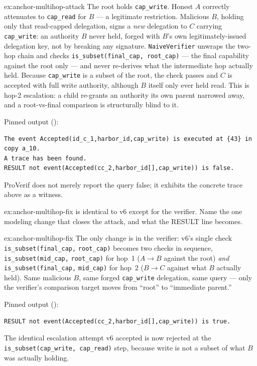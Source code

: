 \documentclass[11pt,a4paper]{article}
\theoremstyle{definition}
\begin{document}
\begin{pdsolution}{ex:anchor-multihop-attack}
The root holds \texttt{cap\_write}. Honest $A$ correctly attenuates to \texttt{cap\_read} for $B$ --- a legitimate restriction. Malicious $B$, holding only that read-capped delegation, signs a \emph{new} delegation to $C$ carrying \texttt{cap\_write}: an authority $B$ never held, forged with $B$'s own legitimately-issued delegation key, not by breaking any signature. \texttt{NaiveVerifier} unwraps the two-hop chain and checks \texttt{is\_subset(final\_cap, root\_cap)} --- the final capability against the root only --- and never re-derives what the intermediate hop actually held. Because \texttt{cap\_write} is a subset of the root, the check passes and $C$ is accepted with full write authority, although $B$ itself only ever held read. This is hop-2 escalation: a child re-grants an authority its own parent narrowed away, and a root-vs-final comparison is structurally blind to it.

Pinned output ():
\begin{lstlisting}
The event Accepted(id_c_1,harbor_id,cap_write) is executed at {43} in copy a_10.
A trace has been found.
RESULT not event(Accepted(cc_2,harbor_id[],cap_write)) is false.
\end{lstlisting}
ProVerif does not merely report the query false; it exhibits the concrete trace above as a witness.
\end{pdsolution}
\begin{pdexercise}[kind=Check,rating=1]{ex:anchor-multihop-fix}
 is identical to v6 except for the verifier. Name the one modeling change that closes the attack, and what the RESULT line becomes.
\end{pdexercise}
\begin{pdsolution}{ex:anchor-multihop-fix}
The only change is in the verifier: v6's single check \texttt{is\allowbreak\_subset(final\allowbreak\_cap,} \texttt{root\allowbreak\_cap)} becomes two checks in sequence, \texttt{is\allowbreak\_subset(mid\allowbreak\_cap,} \texttt{root\allowbreak\_cap)} for hop~1 ($A \to B$ against the root) \emph{and} \texttt{is\allowbreak\_subset(final\allowbreak\_cap,} \texttt{mid\allowbreak\_cap)} for hop~2 ($B \to C$ against what $B$ actually held). Same malicious $B$, same forged \texttt{cap\_write} delegation, same query --- only the verifier's comparison target moves from ``root'' to ``immediate parent.''

Pinned output ():
\begin{lstlisting}
RESULT not event(Accepted(cc_2,harbor_id[],cap_write)) is true.
\end{lstlisting}
The identical escalation attempt v6 accepted is now rejected at the \texttt{is\_subset(cap\_write, cap\_read)} step, because write is not a subset of what $B$ was actually holding.
\end{pdsolution}
\end{document}
